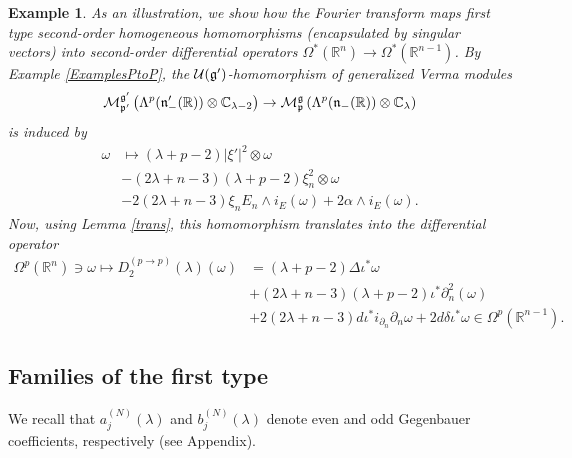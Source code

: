 \documentclass[a4paper,12pt,reqno]{amsart}
\newtheorem{example}[theorem]{Example}
\numberwithin{theorem}{subsection}
\numberwithin{equation}{section}
\begin{document}
\begin{example}\label{translation} As an illustration, we show how the Fourier
transform maps first type second-order homogeneous homomorphisms (encapsulated
by singular vectors) into second-order differential operators $\Omega^*({\mathbb{R}}^n)
\to \Omega^*({\mathbb{R}}^{n-1})$. By Example \ref{ExamplesPtoP}, the
${\fam2U}({{\mathfrak g}}^\prime)$-homomorphism of generalized Verma modules
\begin{equation*}
   {\fam2M}^{{{\mathfrak g}}^\prime}_{{{\mathfrak p}}^\prime}\left(\Lambda^p({{\mathfrak n}}_-^\prime({\mathbb{R}})) \otimes {\mathbb{C}}_{\lambda-2}\right) \to
   {\fam2 M}^{{\mathfrak g}}_{{\mathfrak p}} \left(\Lambda^p({{\mathfrak n}}_-({\mathbb{R}})) \otimes {\mathbb{C}}_\lambda\right)
  \end{equation*}
is induced by
\begin{align*}
   \omega & \mapsto
   (\lambda\!+\!p\!-\!2) |\xi'|^2 \otimes \omega \\
   & -(2\lambda\!+\!n\!-\!3)(\lambda\!+\!p\!-\!2) \xi_n^2 \otimes \omega \\
   & -2(2\lambda\!+\!n\!-\!3) \xi_n E_n \wedge i_E(\omega) + 2 \alpha \wedge i_E(\omega).
\end{align*}
Now, using Lemma \ref{trans}, this homomorphism translates into the
differential operator
\begin{align*}
   \Omega^p({\mathbb{R}}^n) \ni \omega \mapsto D^{(p\to p)}_2(\lambda)(\omega)
   & = (\lambda\!+\!p\!-\!2) \Delta \iota^*\omega \\
   & +(2\lambda\!+\!n\!-\!3) (\lambda\!+\!p\!-\!2)\iota^* \partial_n^2 (\omega) \\
   & +2(2\lambda\!+\!n\!-\!3) {d}\iota^* i_{\partial_n} \partial_n\omega + 2 {d}\delta \iota^*\omega\in\Omega^p({\mathbb{R}}^{n-1}).
\end{align*}
\end{example}

\subsection{Families of the first type}\label{type1}

We recall that $a_j^{(N)}(\lambda)$ and $b_j^{(N)}(\lambda)$ denote even and
odd Gegenbauer coefficients, respectively (see Appendix).
\end{document}
